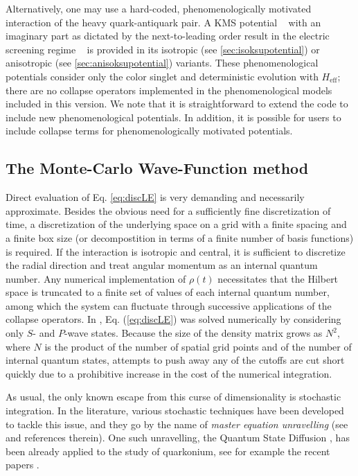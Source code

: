 \documentclass[times,sort&compress,final]{elsarticle}
\begin{document}
Alternatively, one may use a hard-coded, phenomenologically motivated interaction 
of the heavy quark-antiquark pair.
A KMS potential ~\cite{Karsch:1987pv, Dumitru:2009ni, Strickland:2011aa} 
with an imaginary part as dictated by the next-to-leading order result in the 
electric screening regime ~\cite{Laine:2006ns} is provided in its isotropic 
(see \ref{sec:isoksupotential}) or anisotropic (see \ref{sec:anisoksupotential}) variants. 
These phenomenological potentials consider only the color singlet and deterministic 
evolution with $H_\text{eff}$; there are no collapse operators implemented in the phenomenological models included in this version. 
We note that it is straightforward to extend the code to include new phenomenological potentials. In addition, it is possible for users to include collapse terms for phenomenologically motivated potentials.

\subsection{The Monte-Carlo Wave-Function method}
\label{ssec:MCWF}

Direct evaluation of Eq. \eqref{eq:discLE} is very demanding and necessarily approximate. 
Besides the obvious need for a sufficiently fine discretization of time, a 
discretization of the underlying space on a grid with a finite spacing and 
a finite box size (or decompostition in terms of a finite number of basis functions) 
is required. 
If the interaction is isotropic and central, it is sufficient to discretize the 
radial direction and treat angular momentum as an internal quantum number. 
Any numerical implementation of $\rho(t)$ necessitates that the Hilbert space is 
truncated to a finite set of values of each internal quantum number, among which  
the system can fluctuate through successive applications of the collapse operators. 
In \cite{Brambilla:2016wgg,Brambilla:2017zei},  Eq. (\ref{eq:discLE})
was  solved numerically by considering only $S$- and $P$-wave states. 
Because the size of the density matrix grows as $N^2$, where $N$ is the product of 
the number of spatial grid points and of the number of internal quantum states, 
attempts to push away any of the cutoffs are cut short quickly due to a prohibitive 
increase in the cost of the numerical integration. 

As usual, the only known escape from this curse of dimensionality is stochastic
integration. 
In the literature, various stochastic techniques have been developed to tackle 
this issue, and they go by the name of \textit{master equation unravelling} (see 
\cite{Breuer:2002pc} and references therein). 
One such unravelling, the Quantum State Diffusion \cite{Gisin:1992xc}, has been 
already applied to the study of quarkonium, see for example the 
recent papers \cite{Miura:2019ssi,Sharma:2019xum}. 
\end{document}
